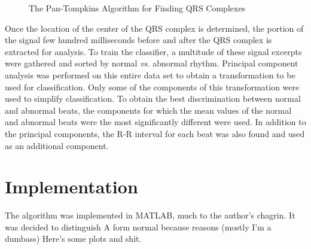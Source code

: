 \documentclass[12pt,letter]{article}
\begin{document}
\begin{figure}[hbtp]
    \centering
    \caption{The Pan-Tompkins Algorithm for Finding QRS Complexes}
    \label{fig:pan}
\end{figure}

Once the location of the center of the QRS complex is determined, the portion of
the signal few hundred milliseconds before and after the QRS complex is
extracted for analysis.  To train the classifier, a multitude of these signal
excerpts were gathered and sorted by normal \textit{vs.} abnormal rhythm.
Principal component analysis was performed on this entire data set to obtain a
transformation to be used for classification.  Only some of the components of
this transformation were used to simplify classification.  To obtain the best
discrimination between normal and abnormal beats, the components for which the
mean values of the normal and abnormal beats were the most significantly
different were used.  In addition to the principal components, the R-R interval
for each beat was also found and used as an additional component.  

\section{Implementation}
The algorithm was implemented in MATLAB, much to the author's chagrin.  It was
decided to distinguish A form normal because reasons (mostly I'm a dumbass) Here's
some plots and shit.  
\end{document}
